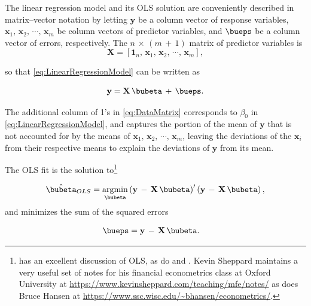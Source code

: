 \documentclass[graybox,envcountchap,sectrefs]{svmono}\usepackage[]{graphicx}\usepackage[]{xcolor}
\begin{document}
\begin{appendices}
The linear regression model and its OLS solution are conveniently
described in matrix--vector notation by letting $\mathrm{\mathbf{y}}$
be a column vector of response variables, $\mathrm{\mathbf{x}}_{1},\,\mathrm{\mathbf{x}}_{2},\,\cdots,\,\mathrm{\mathbf{x}}_{m}$
be column vectors of predictor variables, and $\bueps$ be a column
vector of errors, respectively. The $n\,\times\,(m\,+\,1)$ matrix
of predictor variables is
\begin{equation}
\mathrm{\mathbf{X}}=\left[\mathbf{1}_{n},\,\mathrm{\mathbf{x}}_{1},\,\mathrm{\mathbf{x}}_{2},\,\cdots,\,\mathrm{\mathbf{x}}_{m}\right],\label{eq:DataMatrix}
\end{equation}

so that \eqref{eq:LinearRegressionModel} can be written as

\begin{equation}
\mathrm{\mathbf{y}}=\mathrm{\mathbf{X}}\,\bubeta\,+\,\bueps.\label{eq:LinearRegressionModelVectorized}
\end{equation}

The additional column of 1's in \eqref{eq:DataMatrix} corresponds
to $\beta_{0}$ in \eqref{eq:LinearRegressionModel}, and captures
the portion of the mean of $\mathrm{\mathbf{y}}$ that is not accounted
for by the means of $\mathrm{\mathbf{x}}_{1},\,\mathrm{\mathbf{x}}_{2},\,\cdots,\,\mathrm{\mathbf{x}}_{m}$,
leaving the deviations of the $\mathrm{\mathbf{x}}_{i}$ from their
respective means to explain the deviations of $\mathrm{\mathbf{y}}$
from its mean.

The OLS fit is the solution to\footnote{\citet{Hayashi2000} has an excellent discussion of OLS, as do \citet{Weisberg2014}
and \citet{Greene2018}. Kevin Sheppard maintains a very useful set
of notes for his financial econometrics class at Oxford University
at \url{https://www.kevinsheppard.com/teaching/mfe/notes/} as does
Bruce Hansen at \url{https://www.ssc.wisc.edu/~bhansen/econometrics/}.}

\begin{equation}
\hat{\bubeta}_{OLS}=\underset{\bubeta}{\mathrm{argmin}}\left(\mathrm{\mathbf{y}}\,-\,\mathrm{\mathbf{X}\,}\bubeta\right)^{\prime}\left(\mathrm{\mathbf{y}}\,-\,\mathrm{\mathbf{X}}\,\bubeta\right),\label{eq:OLSbeta}
\end{equation}
and minimizes the sum of the squared errors

\begin{align}
\bueps & =\mathrm{\mathbf{y}}\,-\,\mathrm{\mathbf{X}}\,\bubeta.\label{eq:OLSresiduals}
\end{align}


\end{appendices}
\end{document}

